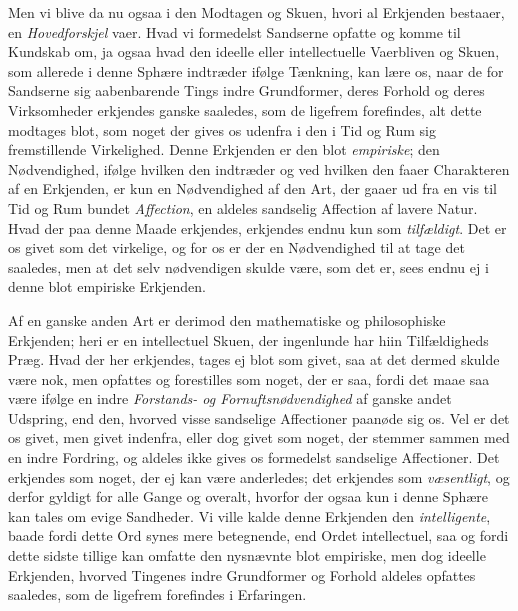 \documentclass[12pt,a4paper]{book}
\newcommand{\apage}[1]{\marginnote{\footnotesize\textit{[#1]}}}
\begin{document}
Men vi blive da nu ogsaa i den Modtagen og Skuen, hvori al Erkjenden bestaaer,
en \emph{Hovedforskjel} vaer. Hvad vi formedelst Sandserne opfatte og komme til
Kundskab om, ja ogsaa hvad den ideelle eller intellectuelle Vaerbliven og Skuen,
som allerede i denne Sphære indtræder ifølge Tænkning, kan lære os, naar de for
Sandserne sig aabenbarende Tings indre Grundformer, deres Forhold og deres
Virksomheder \apage{8} erkjendes ganske saaledes, som de ligefrem forefindes, alt dette
modtages blot, som noget der gives os udenfra i den i Tid og Rum sig
fremstillende Virkelighed. Denne Erkjenden er den blot \emph{empiriske}; den
Nødvendighed, ifølge hvilken den indtræder og ved hvilken den faaer Charakteren
af en Erkjenden, er kun en Nødvendighed af den Art, der gaaer ud fra en vis til
Tid og Rum bundet \emph{Affection}, en aldeles sandselig Affection af lavere
Natur. Hvad der paa denne Maade erkjendes, erkjendes endnu kun som
\emph{tilfældigt}. Det er os givet som det virkelige, og for os er der en
Nødvendighed til at tage det saaledes, men at det selv nødvendigen skulde være,
som det er, sees endnu ej i denne blot empiriske Erkjenden.

Af en ganske anden Art er derimod den mathematiske og philosophiske Erkjenden;
heri er en intellectuel Skuen, der ingenlunde har hiin Tilfældigheds Præg. Hvad
der her erkjendes, tages ej blot som givet, saa at det dermed skulde være nok,
men opfattes og forestilles som noget, der er saa, fordi det maae saa være
ifølge en indre \emph{Forstands- og Fornuftsnødvendighed} af ganske andet
Udspring, end den, hvorved visse sandselige Affectioner paanøde sig os. Vel er
det os givet, men givet indenfra, eller dog givet som noget, der stemmer sammen
med en indre Fordring, og aldeles ikke gives os formedelst sandselige
Affectioner. Det erkjendes \apage{9}  som noget, der ej kan være anderledes; det erkjendes
som \emph{væsentligt}, og derfor gyldigt for alle Gange og overalt, hvorfor der
ogsaa kun i denne Sphære kan tales om evige Sandheder. Vi ville kalde denne
Erkjenden den \emph{intelligente}, baade fordi dette Ord synes mere betegnende,
end Ordet intellectuel, saa og fordi dette sidste tillige kan omfatte den
nysnævnte blot empiriske, men dog ideelle Erkjenden, hvorved Tingenes indre
Grundformer og Forhold aldeles opfattes saaledes, som de ligefrem forefindes i
Erfaringen.
\end{document}

